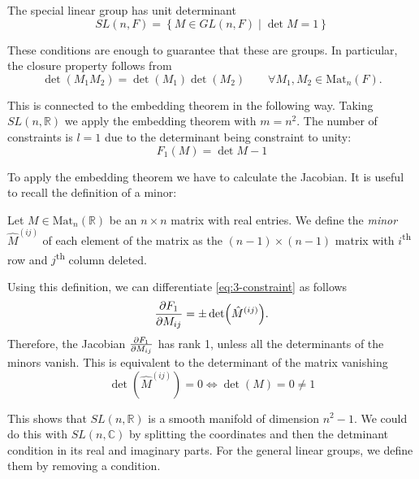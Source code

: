 \begin{definition}
The special linear group has unit determinant
\begin{equation}
  SL(n, F) = \left\{ M \in GL(n, F) \mid \det M = 1 \right\}
\end{equation}
\end{definition}

These conditions are enough to guarantee that these are groups. In particular, the closure property follows from
\begin{equation}
  \det(M_1 M_2) = \det(M_1) \det(M_2) \qquad \forall M_1, M_2 \in \text{Mat}_n(F).
\end{equation}

This is connected to the embedding theorem in the following way.
Taking $SL(n, \mathbb{R})$ we apply the embedding theorem with $m = n^2$. The number of constraints is $l = 1$ due to the determinant being constraint to unity:
\begin{equation}
  \label{eq:3-constraint}
  F_1(M) = \det M - 1
\end{equation}

To apply the embedding theorem we have to calculate the Jacobian. 
It is useful to recall the definition of a minor:
\begin{definition}[minor]
  Let $M \in \text{Mat}_n(\mathbb{R})$ be an $n \times n$ matrix with real entries. We define the \emph{minor} $\hat M^{(ij)}$ of each element of the matrix as the $(n-1) \times (n-1)$ matrix with $i$\textsuperscript{th} row and $j$\textsuperscript{th} column deleted.
\end{definition}
Using this definition, we can differentiate \eqref{eq:3-constraint} as follows
\begin{equation}
  \pdv{F_1}{M_{ij}} = \pm \det(\hat M^{(ij)}).
\end{equation}
Therefore, the Jacobian $\pdv{F_1}{M_{ij}}$ has rank 1, unless all the determinants of the minors vanish.
This is equivalent to the determinant of the matrix vanishing
\begin{equation}
  \det(\hat M^{(ij)}) = 0 \iff \det(M) = 0 \neq 1
\end{equation}

This shows that $SL(n, \mathbb{R})$ is a smooth manifold of dimension $n^2 - 1$.
We could do this with $SL(n, \mathbb{C})$ by splitting the coordinates and then the detminant condition in its real and imaginary parts. For the general linear groups, we define them by removing a condition.

